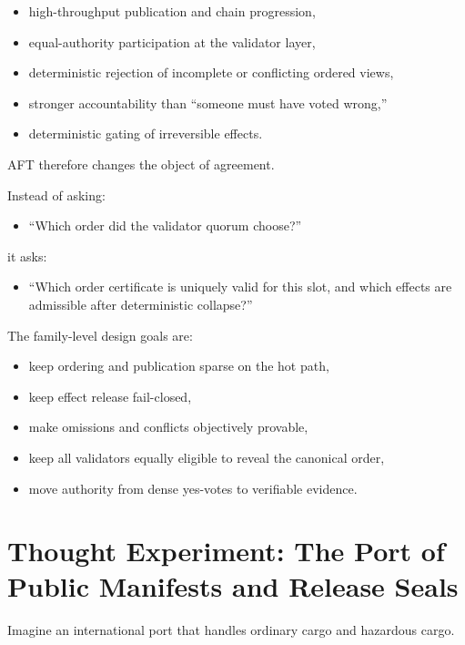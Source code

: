 \documentclass[11pt]{article}
\newcommand{\AFT}{\textsc{AFT}}
\begin{document}
\begin{itemize}[leftmargin=1.5em]
\item high-throughput publication and chain progression,
\item equal-authority participation at the validator layer,
\item deterministic rejection of incomplete or conflicting ordered views,
\item stronger accountability than ``someone must have voted wrong,''
\item deterministic gating of irreversible effects.
\end{itemize}

\AFT{} therefore changes the object of agreement.

Instead of asking:

\begin{itemize}[leftmargin=1.5em]
\item ``Which order did the validator quorum choose?''
\end{itemize}

it asks:

\begin{itemize}[leftmargin=1.5em]
\item ``Which order certificate is uniquely valid for this slot, and which
effects are admissible after deterministic collapse?''
\end{itemize}

The family-level design goals are:

\begin{itemize}[leftmargin=1.5em]
\item keep ordering and publication sparse on the hot path,
\item keep effect release fail-closed,
\item make omissions and conflicts objectively provable,
\item keep all validators equally eligible to reveal the canonical order,
\item move authority from dense yes-votes to verifiable evidence.
\end{itemize}

\section{Thought Experiment: The Port of Public Manifests and Release Seals}

Imagine an international port that handles ordinary cargo and hazardous cargo.
\end{document}
